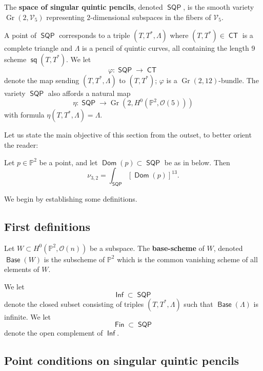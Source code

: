 \documentclass{article}
\renewcommand{\P}{\mathbb{P}}
\renewcommand{\O}{\mathcal{O}}
\DeclareMathOperator{\CT}{\mathsf{CT}}
\DeclareMathOperator{\SQP}{\mathsf{SQP}}
\DeclareMathOperator{\Gr}{Gr}
\DeclareMathOperator{\s}{\mathsf{sq}}
\DeclareMathOperator{\Dom}{\mathsf{Dom}}
\DeclareMathOperator{\Inf}{\mathsf{Inf}}
\DeclareMathOperator{\Fin}{\mathsf{Fin}}
\DeclareMathOperator{\Base}{\mathsf{Base}}
\begin{document}
\begin{definition}
  \label{definition:quinticsingularpencils} The {\bf space of singular quintic pencils}, denoted  $\SQP$, is the
  smooth variety $\Gr(2,\mathcal{V}_{5})$ representing $2$-dimensional subspaces in the fibers of $\mathcal{V}_{5}$.
\end{definition} 
A point of $\SQP$ corresponds to a triple $(T, T^{*}, \Lambda)$
where $(T,T^{*}) \in \CT$ is a complete triangle and $\Lambda$ is a
pencil of quintic curves, all containing the length 9 scheme
$\s(T,T^{*})$. We let \[\varphi: \SQP \to \CT\] denote the map sending
$(T,T^{*},\Lambda)$ to $(T,T^{*})$;  $\varphi$ is a $\Gr(2,12)$-bundle.  The variety $\SQP$ also affords a natural map
\[\eta: \SQP \to \Gr\left(2, H^{0}(\P^{2}, \O(5))\right)\]
with formula $\eta(T,T^{*},\Lambda) = \Lambda$. 

Let us state the main objective of this section from the outset, to better orient the reader: 

\begin{theorem}
    \label{theorem:Domintegral} Let $p \in \P^{2}$ be a point, and let $\Dom(p) \subset \SQP$ be as in  below. Then $$\nu_{3,2} = \int_{\SQP} \left[\Dom(p)\right]^{13}.$$
\end{theorem}
We begin by establishing some definitions.


\subsection{First definitions}



\begin{definition}
    \label{definition:base} Let $W \subset H^{0}(\P^{2},\O(n))$ be a subspace. The {\bf base-scheme} of $W$, denoted $\Base(W)$ is the subscheme of $\P^{2}$ which is the common vanishing scheme of all elements of $W$.
\end{definition}


\begin{definition}
  \label{definition:finite} We let \[\Inf \subset \SQP\] denote the
  closed subset consisting of triples $(T,T^{*},\Lambda)$ such that $\Base(\Lambda)$ is infinite. We let
  \[\Fin \subset \SQP\] denote the open complement of $\Inf$.
\end{definition}


\subsection{Point conditions on singular quintic pencils}
\label{sec:pointconditionSQP}
\end{document}

